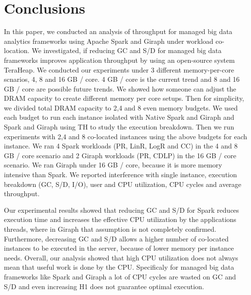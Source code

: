 \section{Conclusions}

In this paper, we conducted an analysis of throughput for managed big data analytics frameworks
using Apache Spark and Giraph under workload co-location. We investigated, if reducing GC and S/D for managed big data frameworks improves application throughput by using an open-source system TeraHeap. We conducted our experiments under 3 different memory-per-core
scnarios, 4, 8 and 16 GB / core. 4 GB / core is the current trend and 8 and 16 GB / core are possible future trends. 
We showed how someone can adjust the DRAM capacity to create different memory per core setups.
Then for simplicity, we divided total DRAM capacity to 2,4 and 8 even memory budgets. We used each budget to run each instance isolated with Native Spark and Giraph and Spark and Giraph using TH to study the execution breakdown.
Then we run experiments with 2,4 and 8 co-located instances using the above budgets for each instance. We ran 4 Spark workloads (PR, LinR, LogR and CC) in the 4 and 8 GB / core scenario and 2 Giraph workloads (PR, CDLP) in the 16 GB / core scenario. We ran Giraph under 16 GB / core, because it is more memory intensive than Spark. We reported interference with single instance, execution breakdown (GC, S/D, I/O), user and CPU utilization, CPU cycles and average throughput.

Our experimental results showed that reducing GC and S/D for Spark reduces execution time and increases the effective CPU utilization by the applications threads, where in Giraph that assumption is not completely confirmed. Furthermore, decreasing GC and S/D allows a higher number of co-located instances to be executed in the server, because of lower memory per instance needs. Overall, our analysis showed that high CPU utilization does not always mean that useful work is done by the CPU. Specificaly for managed
big data frameworks like Spark and Giraph a lot of CPU cycles are wasted on GC and S/D and even increasing H1 does not guarantee optimal execution.
